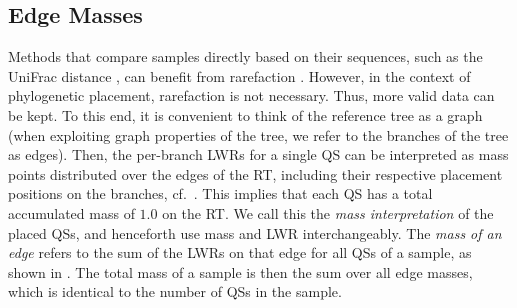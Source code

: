 
\subsection{Edge Masses}
\label{ch:Foundations:sec:PhylogeneticPlacementProcessing:sub:EdgeMasses}

Methods that compare samples directly based on their sequences,
such as the UniFrac distance \cite{Lozupone2005,Lozupone2007a},
can benefit from rarefaction \cite{Weiss2017}.
However, in the context of phylogenetic placement, rarefaction is not necessary.
Thus, more valid data can be kept.
To this end, it is convenient to think of the reference tree as a graph
(when exploiting graph properties of the tree, we refer to the branches of the tree as edges).
Then, the per-branch \acp{LWR} for a single \ac{QS}
can be interpreted as mass points distributed over the edges of the \ac{RT},
including their respective placement positions on the branches,
cf.~.
This implies that each \ac{QS} has a total accumulated mass of $1.0$ on the \ac{RT}.
We call this the \emph{mass interpretation} of the placed \acp{QS}, and henceforth use mass and \ac{LWR} interchangeably.
The \emph{mass of an edge} refers to the sum of the \acp{LWR} on that edge for all \acp{QS} of a sample,
as shown in .
The total mass of a sample is then the sum over all edge masses,
which is identical to the number of \acp{QS} in the sample.

